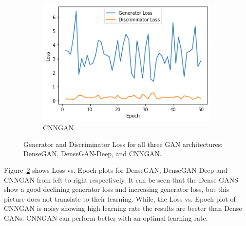 \documentclass{article}
\begin{document}
\begin{figure}[htbp]
\begin{subfigure}[t]{0.32\textwidth}
			\centering
			\includegraphics[scale=0.33]{GAN_CNN_LossEpoch.png}
			\caption{CNNGAN.}
			\label{fig:GANLoss_3}
		\end{subfigure}
		\caption{ Generator and Discriminator Loss for all three GAN architectures: DenseGAN, DenseGAN-Deep, and CNNGAN.}
		\label{fig:ResultsGANLoss}
	\end{figure}

		Figure~\ref{fig:ResultsGANLoss} shows Loss vs. Epoch plots for DenseGAN, DenseGAN-Deep and CNNGAN from left to right respectively. It can be seen that the Dense GANS show a good declining generator loss and increasing generator loss, but this picture does not translate to their learning. While, the Loss vs. Epoch plot of CNNGAN is noisy showing high learning rate the results are beeter than Dense GANs. CNNGAN can perform better with an optimal learning rate.
	
\end{document}

